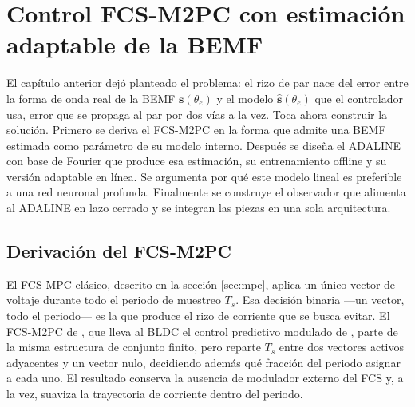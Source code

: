 \documentclass[../../../Tesis_JALS_Maestria.tex]{subfiles}
\begin{document}
\providecommand{\figpend}[1]{%
    \fbox{\begin{minipage}[c][4.2cm][c]{0.85\linewidth}\centering
        \itshape\small [FIGURA PENDIENTE]\\[4pt] #1
    \end{minipage}}%
}

\chapter{Control FCS-M2PC con estimación adaptable de la BEMF}
\label{cap:desarrollo}

El capítulo anterior dejó planteado el problema: el rizo de par nace del error entre la forma de onda real de la BEMF $\mathbf{s}(\theta_e)$ y el modelo $\hat{\mathbf{s}}(\theta_e)$ que el controlador usa, error que se propaga al par por dos vías a la vez. Toca ahora construir la solución. Primero se deriva el FCS-M2PC en la forma que admite una BEMF estimada como parámetro de su modelo interno. Después se diseña el ADALINE con base de Fourier que produce esa estimación, su entrenamiento offline y su versión adaptable en línea. Se argumenta por qué este modelo lineal es preferible a una red neuronal profunda. Finalmente se construye el observador que alimenta al ADALINE en lazo cerrado y se integran las piezas en una sola arquitectura.

\section{Derivación del FCS-M2PC}
\label{sec:m2pc}

El FCS-MPC clásico, descrito en la sección \ref{sec:mpc}, aplica un único vector de voltaje durante todo el periodo de muestreo $T_s$. Esa decisión binaria ---un vector, todo el periodo--- es la que produce el rizo de corriente que se busca evitar. El FCS-M2PC de \citet{coronado2025}, que lleva al BLDC el control predictivo modulado de \citet{tarisciotti2014m2pc, tarisciotti2015m2pc}, parte de la misma estructura de conjunto finito, pero reparte $T_s$ entre dos vectores activos adyacentes y un vector nulo, decidiendo además qué fracción del periodo asignar a cada uno. El resultado conserva la ausencia de modulador externo del FCS y, a la vez, suaviza la trayectoria de corriente dentro del periodo.
\end{document}
